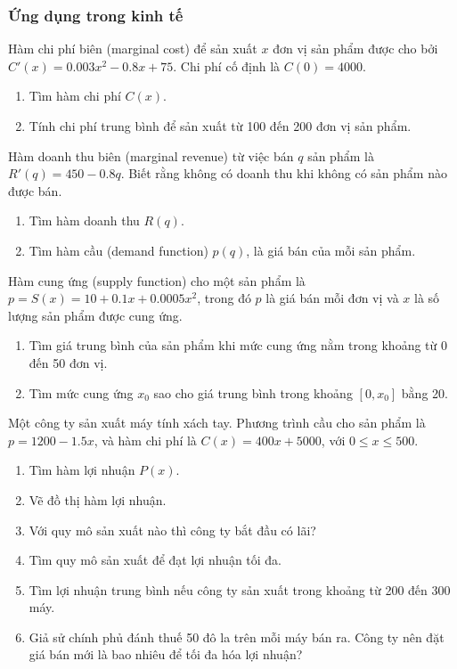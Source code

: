 \subsubsection{Ứng dụng trong kinh tế}

\begin{exercise}
    Hàm chi phí biên (marginal cost) để sản xuất $x$ đơn vị sản phẩm được cho bởi $C'(x) = 0.003x^2 - 0.8x + 75$. Chi phí cố định là $C(0) = 4000$.
    \begin{enumerate}[label=(\alph*)]
        \item Tìm hàm chi phí $C(x)$.
        \item Tính chi phí trung bình để sản xuất từ 100 đến 200 đơn vị sản phẩm.
    \end{enumerate}
\end{exercise}

\begin{exercise}
    Hàm doanh thu biên (marginal revenue) từ việc bán $q$ sản phẩm là $R'(q) = 450 - 0.8q$. Biết rằng không có doanh thu khi không có sản phẩm nào được bán.
    \begin{enumerate}[label=(\alph*)]
        \item Tìm hàm doanh thu $R(q)$.
        \item Tìm hàm cầu (demand function) $p(q)$, là giá bán của mỗi sản phẩm.
    \end{enumerate}
\end{exercise}

\begin{exercise}
    Hàm cung ứng (supply function) cho một sản phẩm là $p = S(x) = 10 + 0.1x + 0.0005x^2$, trong đó $p$ là giá bán mỗi đơn vị và $x$ là số lượng sản phẩm được cung ứng.
    \begin{enumerate}[label=(\alph*)]
        \item Tìm giá trung bình của sản phẩm khi mức cung ứng nằm trong khoảng từ 0 đến 50 đơn vị.
        \item Tìm mức cung ứng $x_0$ sao cho giá trung bình trong khoảng $[0, x_0]$ bằng 20.
    \end{enumerate}
\end{exercise}

\begin{exercise}
    Một công ty sản xuất máy tính xách tay. Phương trình cầu cho sản phẩm là $p = 1200 - 1.5x$, và hàm chi phí là $C(x) = 400x + 5000$, với $0 \le x \le 500$.
    \begin{enumerate}[label=(\alph*)]
        \item Tìm hàm lợi nhuận $P(x)$.
        \item Vẽ đồ thị hàm lợi nhuận.
        \item Với quy mô sản xuất nào thì công ty bắt đầu có lãi?
        \item Tìm quy mô sản xuất để đạt lợi nhuận tối đa.
        \item Tìm lợi nhuận trung bình nếu công ty sản xuất trong khoảng từ 200 đến 300 máy.
        \item Giả sử chính phủ đánh thuế 50 đô la trên mỗi máy bán ra. Công ty nên đặt giá bán mới là bao nhiêu để tối đa hóa lợi nhuận?
    \end{enumerate}
\end{exercise}

